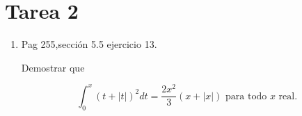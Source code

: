 \documentclass{report}
\begin{document}
    \tableofcontents

    \pagebreak
    \chapter{ Tarea 2 }

    \begin{enumerate}
        \item Pag 255,sección 5.5 ejercicio 13.

        Demostrar que

        $$
        \int_{0}^{x}(t+|t|)^{2} d t=\frac{2 x^{2}}{3}(x+|x|) \text { para todo } x \text { real. }
        $$\\
    \end{enumerate}
\end{document}
